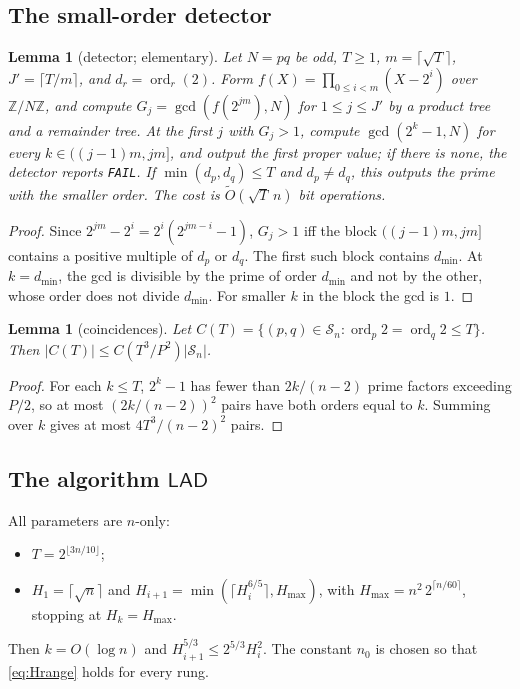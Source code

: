 \documentclass[11pt]{amsart}
\newtheorem{lemma}[theorem]{Lemma}
\theoremstyle{definition}
\newcommand{\Z}{\mathbb{Z}}
\newcommand{\Sn}{\mathcal{S}_n}
\newcommand{\ord}{\operatorname{ord}}
\newcommand{\LAD}{\textsf{LAD}}
\begin{document}
\subsection{The small-order detector}

\begin{lemma}[detector; elementary]\label{lem:detector}
Let $N=pq$ be odd, $T\ge1$, $m=\lceil\sqrt T\rceil$, $J'=\lceil T/m\rceil$, and $d_r=\ord_r(2)$.
Form $f(X)=\prod_{0\le i<m}(X-2^i)$ over $\Z/N\Z$, and compute $G_j=\gcd(f(2^{jm}),N)$ for
$1\le j\le J'$ by a product tree and a remainder tree. At the first $j$ with $G_j>1$, compute
$\gcd(2^k-1,N)$ for every $k\in((j-1)m,jm]$, and output the first proper value; if there is none, the detector reports
\texttt{FAIL}. If $\min(d_p,d_q)\le T$ and $d_p\ne d_q$, this outputs the prime with the smaller order. The cost
is $\tilde O(\sqrt T\,n)$ bit operations.
\end{lemma}
\begin{proof}
Since $2^{jm}-2^i=2^i(2^{jm-i}-1)$, $G_j>1$ iff the block $((j-1)m,jm]$ contains a positive
multiple of $d_p$ or $d_q$. The first such block contains $d_{\min}$. At $k=d_{\min}$, the gcd is
divisible by the prime of order $d_{\min}$ and not by the other, whose order does not divide
$d_{\min}$. For smaller $k$ in the block the gcd is $1$.
\end{proof}

\begin{lemma}[coincidences]\label{lem:coinc}
Let $C(T)=\{(p,q)\in\Sn:\ord_p2=\ord_q2\le T\}$. Then $|C(T)|\le C(T^3/P^2)|\Sn|$.
\end{lemma}
\begin{proof}
For each $k\le T$, $2^k-1$ has fewer than $2k/(n-2)$ prime factors exceeding $P/2$, so at most
$(2k/(n-2))^2$ pairs have both orders equal to $k$. Summing over $k$ gives at most
$4T^3/(n-2)^2$ pairs.
\end{proof}

\subsection{The algorithm \texorpdfstring{$\LAD$}{LAD}}
All parameters are $n$-only:
\begin{itemize}
\item $T=2^{\lfloor3n/10\rfloor}$;
\item $H_1=\lceil\sqrt n\rceil$ and $H_{i+1}=\min(\lceil H_i^{6/5}\rceil,H_{\max})$, with
  $H_{\max}=n^2\,2^{\lceil n/60\rceil}$, stopping at $H_k=H_{\max}$.
\end{itemize}
Then $k=O(\log n)$ and $H_{i+1}^{5/3}\le2^{5/3}H_i^2$. The constant $n_0$ is chosen so that
\eqref{eq:Hrange} holds for every rung.
\end{document}
